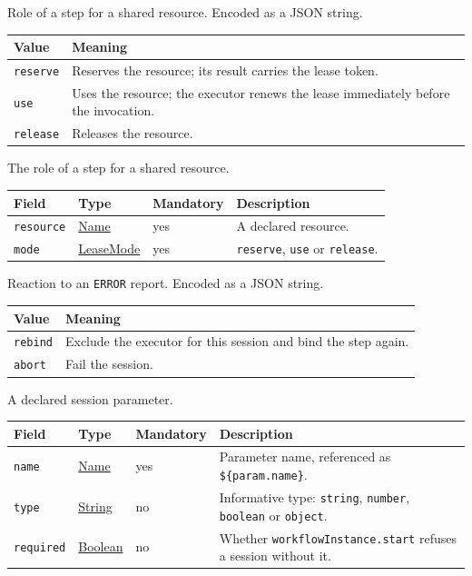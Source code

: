 \documentclass[a4paper]{arrowhead}
\newcommand{\mref}[1]{{\textcolor{ArrowheadPurple}{\hyperref[sec:model:#1]{#1}}}}
\newcommand{\pref}[1]{{\textcolor{ArrowheadGrey}{\hyperref[sec:model:primitives:#1]{#1}}}}
\begin{document}
Role of a step for a shared resource.
 Encoded as a JSON string.
{\small
\begin{longtable}{|p{3.9cm}|p{11.9cm}|}

\hline
\rowcolor{gray!33} Value & Meaning \\ \hline
\endhead
\texttt{reserve} & Reserves the resource; its result carries the lease token. \\ \hline
\texttt{use} & Uses the resource; the executor renews the lease immediately before the invocation. \\ \hline
\texttt{release} & Releases the resource. \\ \hline
\end{longtable}
}

The role of a step for a shared resource.

{\small
\begin{longtable}{|p{3.7cm}|p{4.2cm}|p{1.6cm}|p{6.3cm}|}

\hline
\rowcolor{gray!33} Field & Type & Mandatory & Description \\ \hline
\endhead
\texttt{resource} & \pref{Name} & yes & A declared resource. \\ \hline
\texttt{mode} & \mref{LeaseMode} & yes & \texttt{reserve}, \texttt{use} or \texttt{release}. \\ \hline
\end{longtable}
}

Reaction to an \texttt{ERROR} report.
 Encoded as a JSON string.
{\small
\begin{longtable}{|p{3.9cm}|p{11.9cm}|}

\hline
\rowcolor{gray!33} Value & Meaning \\ \hline
\endhead
\texttt{rebind} & Exclude the executor for this session and bind the step again. \\ \hline
\texttt{abort} & Fail the session. \\ \hline
\end{longtable}
}

A declared session parameter.

{\small
\begin{longtable}{|p{3.7cm}|p{4.2cm}|p{1.6cm}|p{6.3cm}|}

\hline
\rowcolor{gray!33} Field & Type & Mandatory & Description \\ \hline
\endhead
\texttt{name} & \pref{Name} & yes & Parameter name, referenced as \texttt{\$\{param.name\}}. \\ \hline
\texttt{type} & \pref{String} & no & Informative type: \texttt{string}, \texttt{number}, \texttt{boolean} or \texttt{object}. \\ \hline
\texttt{required} & \pref{Boolean} & no & Whether \texttt{workflowInstance.start} refuses a session without it. \\ \hline
\end{longtable}
}
\end{document}

